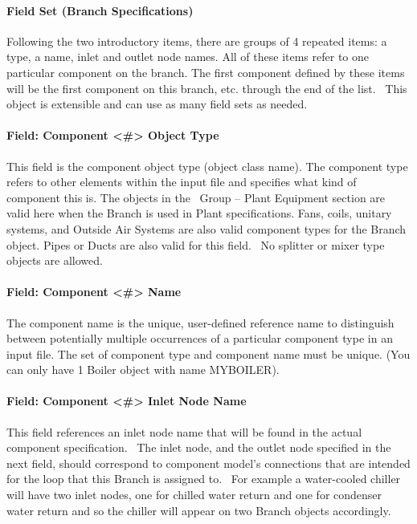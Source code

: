 \paragraph{Field Set (Branch Specifications)}\label{field-set-branch-specifications}

Following the two introductory items, there are groups of 4 repeated items: a type, a name, inlet and outlet node names. All of these items refer to one particular component on the branch. The first component defined by these items will be the first component on this branch, etc. through the end of the list.~ This object is extensible and can use as many field sets as needed.

\paragraph{Field: Component \textless{}\#\textgreater{} Object Type}\label{field-component-object-type-000}

This field is the component object type (object class name). The component type refers to other elements within the input file and specifies what kind of component this is. The objects in the~ Group -- Plant Equipment section are valid here when the Branch is used in Plant specifications. Fans, coils, unitary systems, and Outside Air Systems are also valid component types for the Branch object. Pipes or Ducts are also valid for this field.~ No splitter or mixer type objects are allowed.

\paragraph{Field: Component \textless{}\#\textgreater{} Name}\label{field-component-name-001}

The component name is the unique, user-defined reference name to distinguish between potentially multiple occurrences of a particular component type in an input file. The set of component type and component name must be unique. (You can only have 1 Boiler object with name MYBOILER).

\paragraph{Field: Component \textless{}\#\textgreater{} Inlet Node Name}\label{field-component-inlet-node-name}

This field references an inlet node name that will be found in the actual component specification.~ The inlet node, and the outlet node specified in the next field, should correspond to component model's connections that are intended for the loop that this Branch is assigned to.~ For example a water-cooled chiller will have two inlet nodes, one for chilled water return and one for condenser water return and so the chiller will appear on two Branch objects accordingly.

